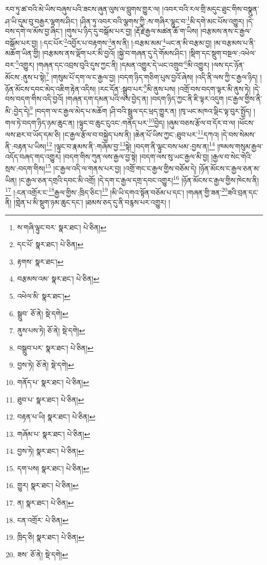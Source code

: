 རབ་ཏུ་ཚ་བའི་མེ་ཡིས་བཞུས་པའི་ཟངས་ཞུན་ལུས་ལ་བླུགས་གྱུར་ལ། །འབར་བའི་རལ་གྲི་མདུང་ཐུང་གིས་བསྣུན་ཤ་ཡི་དུམ་བུ་བརྒྱར་ལྷགས་ཤིང་། །ཤིན་ཏུ་འབར་བའི་ལྕགས་ཀྱི་:ས་གཞིར་ལྷུང་བ་\footnote{ས་གཞི་ལྟུང་བར་  སྣར་ཐང་།  པེ་ཅིན། }མི་དགེ་མང་པོས་འགྱུར། །དེ་བས་དགེ་ལ་མོས་བྱ་ཞིང་། །གུས་པ་ཉིད་དུ་བསྒོམ་པར་བྱ། །རྡོ་རྗེ་རྒྱལ་མཚན་ཆོ་ག་ཡིས། །བརྩམས་ནས་ང་རྒྱལ་བསྒོམ་པར་བྱ། །:དང་པོར་\footnote{དང་པོ་  སྣར་ཐང་།  པེ་ཅིན། }འབྱོར་པ་བརྟགས་\footnote{རྟགས་  སྣར་ཐང་། }ནས་ནི། །:བརྩམ་མམ་\footnote{བརྩམས་འམ་  སྣར་ཐང་།  པེ་ཅིན། }ཡང་ན་མི་བརྩམ་བྱ། །མ་བརྩམས་པ་ནི་མཆོག་ཡིན་གྱི། །བརྩམས་ནས་ལྡོག་པར་མི་བྱའོ། །སྐྱེ་བ་གཞན་དུ་དེ་གོམས་ཤིང་། །སྡིག་དང་སྡུག་བསྔལ་:འཕེལ་བར་\footnote{འཕེལ་མི་  སྣར་ཐང་། }འགྱུར། །གཞན་དང་འབྲས་བུའི་དུས་ཀྱང་ནི། །དམན་འགྱུར་དེ་ཡང་འགྲུབ་\footnote{སྒྲུབ་  ཅོ་ནེ།  སྡེ་དགེ། }མི་འགྱུར། །ལས་དང་ཉོན་མོངས་:ནུས་པ་སྟེ།\footnote{ནུས་པས་ཏེ།  ཅོ་ནེ།  སྡེ་དགེ། } །གསུམ་པོ་དག་ལ་ང་རྒྱལ་བྱ། །བདག་ཉིད་གཅིག་པུས་བྱའོ་ཞེས། །འདི་ནི་ལས་ཀྱི་ང་རྒྱལ་ཉིད། །ཉོན་མོངས་དབང་མེད་འཇིག་རྟེན་འདིས། །རང་དོན་:སྒྲུབ་པར་\footnote{བསྒྲུབ་པར་  སྣར་ཐང་།  པེ་ཅིན། }མི་ནུས་པས། །འགྲོ་བས་བདག་ལྟར་མི་ནུས་ཏེ། །དེ་བས་བདག་གིས་འདི་བྱའོ། །གཞན་དག་དམན་པའི་ལས་བྱེད་ན། །བདག་ཉིད་ཀྱང་ནི་ཇི་ལྟར་འདུག །ང་རྒྱལ་གྱིས་ནི་མི་:བྱེད་དེ།\footnote{བྱས་ཏེ།  ཅོ་ནེ།  སྡེ་དགེ། } །བདག་ལ་ང་རྒྱལ་མེད་པ་མཆོག །ཤི་བའི་སྦྲུལ་དང་ཕྲད་གྱུར་ན། །ཁྭ་ཡང་མཁའ་ལྡིང་ལྟ་བུར་སྤྱོད། །གལ་ཏེ་བདག་ཉིད་ཉམ་ཆུང་ན། །ལྟུང་བ་ཆུང་ངུའང་:གནོད་པར་\footnote{གནོད་པ་  སྣར་ཐང་།  པེ་ཅིན། }བྱེད། །ཞུམ་བཅས་རྩོལ་བ་དོར་བ་ལ། །ཕོངས་ལས་ཐར་བ་ཡོད་དམ་ཅི། །ང་རྒྱལ་རྩོལ་བ་བསྐྱེད་པས་ནི། །ཆེན་པོ་ཡིས་ཀྱང་:ཐུབ་པར་\footnote{ཐུབ་པ་  སྣར་ཐང་།  པེ་ཅིན། }དཀའ། །དེ་བས་སེམས་ནི་:བརྟན་པ་ཡིས།\footnote{བརྟན་པ་ཡི།  སྣར་ཐང་།  པེ་ཅིན། } །ལྟུང་བ་རྣམས་ནི་:གཞོམ་བྱ་\footnote{གཞོམ་པ་  སྣར་ཐང་།  པེ་ཅིན། }སྟེ། །བདག་ནི་ལྟུང་བས་ཕམ་:བྱས་ན།\footnote{བྱས་ཏེ།  སྣར་ཐང་།  པེ་ཅིན། } །ཁམས་གསུམ་རྒྱལ་འདོད་བཞད་གད་འགྱུར། །བདག་གིས་ཀུན་ལས་རྒྱལ་བྱ་སྟེ། །བདག་ལས་སུ་ཡང་རྒྱལ་མི་བྱ། །རྒྱལ་བ་སེང་གེའི་སྲས་:བདག་གིས།\footnote{དག་པས།  སྣར་ཐང་།  པེ་ཅིན། } །ང་རྒྱལ་འདི་ལ་གནས་པར་བྱ། །འགྲོ་གང་ང་རྒྱལ་གྱིས་བཅོམ་དེ། །ཉོན་མོངས་ང་རྒྱལ་ཅན་མ་ཡིན། །ང་རྒྱལ་ཅན་དགྲའི་དབང་མི་འགྲོ། །དེ་དག་ང་རྒྱལ་དགྲ་དབང་འགྱུར།\footnote{གྱུར།  སྣར་ཐང་།  པེ་ཅིན། } །ཉོན་མོངས་ང་རྒྱལ་གྱིས་ཁེངས་ནི།\footnote{ན།  སྣར་ཐང་།  པེ་ཅིན། } །:ངན་འགྲོར་ང་\footnote{ངན་འགྲོར་  པེ་ཅིན། }རྒྱལ་གྱིས་:ཁྲིད་ཅིང་།\footnote{ཁྲིད་ཅི།  སྣར་ཐང་།  པེ་ཅིན། } །མི་ཡི་དགའ་སྟོན་བཅོམ་པ་དང་། །གཞན་གྱི་ཟན་\footnote{ཟས་  ཅོ་ནེ།  སྡེ་དགེ། }ཟའི་བྲན་དང་ནི། །གླེན་པ་མི་སྡུག་ཉམ་ཆུང་དང་། །ཐམས་ཅད་དུ་ནི་བརྙས་པར་འགྱུར། །
